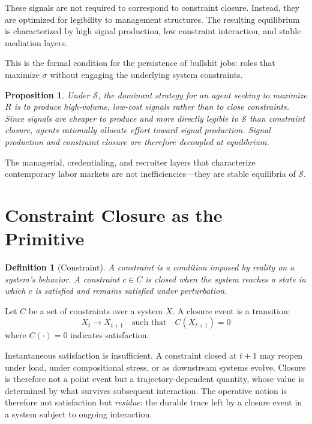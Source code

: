 \documentclass[12pt]{article}
\newtheorem{definition}{Definition}
\newtheorem{proposition}{Proposition}
\begin{document}
These signals are not required to correspond to constraint closure.
Instead, they are optimized for legibility to management structures.
The resulting equilibrium is characterized by high signal production,
low constraint interaction, and stable mediation layers.

This is the formal condition for the persistence of bullshit jobs: roles
that maximize $\sigma$ without engaging the underlying system
constraints.

\begin{proposition}
Under $\mathcal{S}$, the dominant strategy for an agent seeking to
maximize $R$ is to produce high-volume, low-cost signals rather than to
close constraints. Since signals are cheaper to produce and more directly
legible to $\mathcal{S}$ than constraint closure, agents rationally
allocate effort toward signal production. Signal production and
constraint closure are therefore decoupled at equilibrium.
\end{proposition}

The managerial, credentialing, and recruiter layers that characterize
contemporary labor markets are not inefficiencies---they are stable
equilibria of $\mathcal{S}$.

\section{Constraint Closure as the Primitive}

\begin{definition}[Constraint]
A \emph{constraint} is a condition imposed by reality on a system's
behavior. A constraint $c \in C$ is \emph{closed} when the system
reaches a state in which $c$ is satisfied and remains satisfied under
perturbation.
\end{definition}

Let $C$ be a set of constraints over a system $X$. A closure event is a
transition:
\[
  X_t \rightarrow X_{t+1} \quad \text{such that} \quad C(X_{t+1}) = 0
\]
where $C(\cdot) = 0$ indicates satisfaction.

Instantaneous satisfaction is insufficient. A constraint closed at
$t+1$ may reopen under load, under compositional stress, or as
downstream systems evolve. Closure is therefore not a point event but a
trajectory-dependent quantity, whose value is determined by what
survives subsequent interaction. The operative notion is therefore not
satisfaction but \emph{residue}: the durable trace left by a closure
event in a system subject to ongoing interaction.
\end{document}
